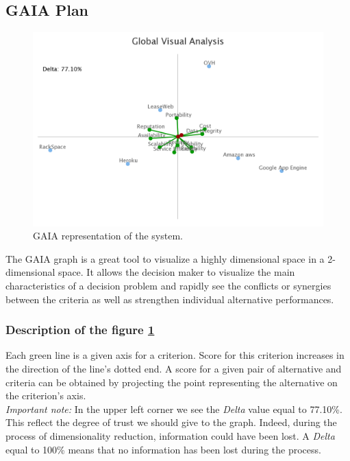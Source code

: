 \documentclass[a4paper,11pt]{article}
\begin{document}
\subsection{GAIA Plan}

\begin{figure}
  \centering
  \includegraphics[width=\textwidth-2cm]{img/Result/gaia_plane.png}
  \caption{GAIA representation of the system.}
  \label{fig:gaia}
\end{figure}

The GAIA graph is a great tool to visualize a highly dimensional space in a 2-dimensional space. It allows the decision maker to visualize the main characteristics of a decision problem and rapidly see the conflicts or synergies between the criteria as well as strengthen individual alternative performances.

\subsubsection*{Description of the figure \ref{fig:gaia}}

Each green line is a given axis for a criterion. Score for this criterion increases in the direction of the line's dotted end. A score for a given pair of alternative and criteria can be obtained by projecting the point representing the alternative on the criterion's axis. \\

\emph{Important note: } In the upper left corner we see the \textit{Delta} value equal to 77.10\%. This reflect the degree of trust we should give to the graph. Indeed, during the process of dimensionality reduction, information could have been lost. A \textit{Delta} equal to 100\% means that no information has been lost during the process.\\
\end{document}
